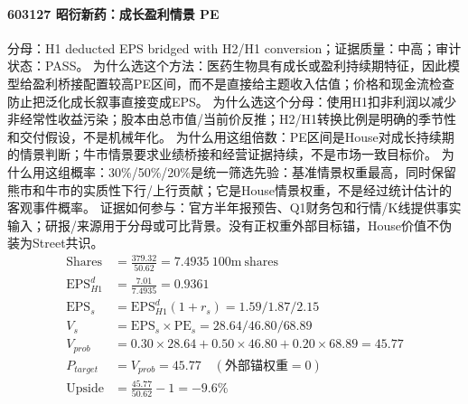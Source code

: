\paragraph{603127 昭衍新药：成长盈利情景 PE}
分母：H1 deducted EPS bridged with H2/H1 conversion；证据质量：中高；审计状态：PASS。
为什么选这个方法：医药生物具有成长或盈利持续期特征，因此模型给盈利桥接配置较高PE区间，而不是直接给主题收入估值；价格和现金流检查防止把泛化成长叙事直接变成EPS。
为什么选这个分母：使用H1扣非利润以减少非经常性收益污染；股本由总市值/当前价反推；H2/H1转换比例是明确的季节性和交付假设，不是机械年化。
为什么用这组倍数：PE区间是House对成长持续期的情景判断；牛市情景要求业绩桥接和经营证据持续，不是市场一致目标价。
为什么用这组概率：30\%/50\%/20\%是统一筛选先验：基准情景权重最高，同时保留熊市和牛市的实质性下行/上行贡献；它是House情景权重，不是经过统计估计的客观事件概率。
证据如何参与：官方半年报预告、Q1财务包和行情/K线提供事实输入；研报/来源用于分母或可比背景。没有正权重外部目标锚，House价值不伪装为Street共识。
\begin{align*}
\mathrm{Shares} &= \frac{379.32}{50.62}=7.4935\ \mathrm{100m\ shares}\\
\mathrm{EPS}_{H1}^d &= \frac{7.01}{7.4935}=0.9361\\
\mathrm{EPS}_s &= \mathrm{EPS}_{H1}^d(1+r_s)=1.59/1.87/2.15\\
V_s &= \mathrm{EPS}_s\times \mathrm{PE}_s=28.64/46.80/68.89\\
V_{prob} &= 0.30\times 28.64+0.50\times 46.80+0.20\times 68.89=45.77\\
P_{target} &= V_{prob}=45.77\quad(\text{外部锚权重}=0)\\
\mathrm{Upside} &= \frac{45.77}{50.62}-1=-9.6\%\\
\end{align*}

